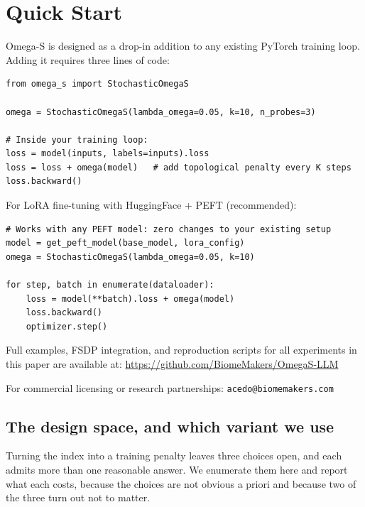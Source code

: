\documentclass[11pt,a4paper]{article}
\begin{document}
\section*{Quick Start}
\label{sec:quickstart}

Omega-S is designed as a drop-in addition to any existing PyTorch training
loop. Adding it requires three lines of code:

\begin{verbatim}
from omega_s import StochasticOmegaS

omega = StochasticOmegaS(lambda_omega=0.05, k=10, n_probes=3)

# Inside your training loop:
loss = model(inputs, labels=inputs).loss
loss = loss + omega(model)   # add topological penalty every K steps
loss.backward()
\end{verbatim}

For LoRA fine-tuning with HuggingFace + PEFT (recommended):

\begin{verbatim}
# Works with any PEFT model: zero changes to your existing setup
model = get_peft_model(base_model, lora_config)
omega = StochasticOmegaS(lambda_omega=0.05, k=10)

for step, batch in enumerate(dataloader):
    loss = model(**batch).loss + omega(model)
    loss.backward()
    optimizer.step()
\end{verbatim}

Full examples, FSDP integration, and reproduction scripts for all
experiments in this paper are available at:
\url{https://github.com/BiomeMakers/OmegaS-LLM}

For commercial licensing or research partnerships:
\texttt{acedo@biomemakers.com}


\subsection{The design space, and which variant we use}
\label{sec:variantes}

Turning the index into a training penalty leaves three choices open, and each
admits more than one reasonable answer. We enumerate them here and report what
each costs, because the choices are not obvious a priori and because two of the
three turn out not to matter.
\end{document}
